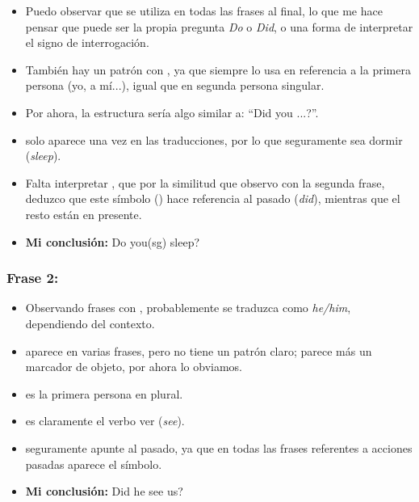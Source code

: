 \begin{itemize}
	\item Puedo observar que  se utiliza en todas las frases al final, lo que me hace pensar que puede ser la propia pregunta \textit{Do} o \textit{Did}, o una forma de interpretar el signo de interrogación.
	
	\item También hay un patrón con , ya que siempre lo usa en referencia a la primera persona (yo, a mí...), igual que  en segunda persona singular.
	
	\item Por ahora, la estructura sería algo similar a: ``Did you ...?''.
	
	\item {} solo aparece una vez en las traducciones, por lo que seguramente sea dormir (\textit{sleep}).
	
	\item Falta interpretar , que por la similitud que observo con la segunda frase, deduzco que este símbolo () hace referencia al pasado (\textit{did}), mientras que el resto están en presente.
	
	\item \textbf{Mi conclusión:} Do you(sg) sleep?
\end{itemize}

\subsubsection*{Frase 2: \footnotesize{}}

\begin{itemize}
	\item Observando frases con , probablemente se traduzca como \textit{he/him}, dependiendo del contexto.
	
	\item {} aparece en varias frases, pero no tiene un patrón claro; parece más un marcador de objeto, por ahora lo obviamos.
	
	\item {} es la primera persona en plural.
	
	\item {} es claramente el verbo ver (\textit{see}).
	
	\item {} seguramente apunte al pasado, ya que en todas las frases referentes a acciones pasadas aparece el símbolo.
	
	\item \textbf{Mi conclusión:} Did he see us?
\end{itemize}

